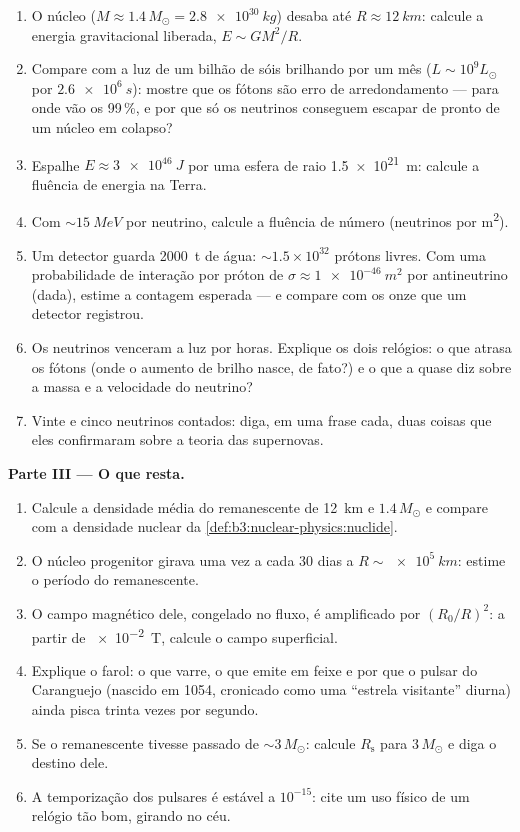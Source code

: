 \begin{problem}
\begin{enumerate}[resume]
  \item O núcleo ($M \approx 1.4\,M_\odot = \qty{2.8e30}{kg}$)
        desaba até $R \approx \qty{12}{km}$: calcule a
        energia gravitacional liberada, $E \sim GM^2/R$.
  \item Compare com a luz de um bilhão de sóis brilhando por um
        mês ($L \sim 10^{9}L_\odot$ por $\qty{2.6e6}{s}$):
        mostre que os fótons são erro de arredondamento --- para onde vão
        os 99\,\%, e por que só os neutrinos conseguem escapar de pronto
        de um núcleo em colapso?
  \item Espalhe $E \approx \qty{3e46}{J}$ por uma esfera de
        raio \qty{1.5e21}{m}: calcule a fluência de energia na
        Terra.
  \item Com $\sim\qty{15}{MeV}$ por neutrino, calcule a
        fluência de número (neutrinos por \unit{m^2}).
  \item Um detector guarda \qty{2000}{t} de água:
        ${\sim}1.5\times10^{32}$ prótons livres. Com uma
        probabilidade de interação por próton de
        $\sigma \approx \qty{1e-46}{m^2}$ por antineutrino
        (dada), estime a contagem esperada --- e compare
        com os onze que um detector registrou.
  \item Os neutrinos venceram a luz por horas. Explique os dois
        relógios: o que atrasa os fótons (onde o
        aumento de brilho nasce, de fato?) e o que a
        quase  diz sobre a massa e a
        velocidade do neutrino?
  \item Vinte e cinco neutrinos contados: diga, em uma frase
        cada, duas coisas que eles confirmaram sobre a teoria das supernovas.
\end{enumerate}

\medskip\noindent\textbf{Parte III --- O que resta.}

\begin{enumerate}[resume]
  \item Calcule a densidade média do remanescente de \qty{12}{km} e
        $1.4\,M_\odot$ e compare com a densidade nuclear da
        \cref{def:b3:nuclear-physics:nuclide}.
  \item O núcleo progenitor girava uma vez a cada 30 dias a
        $R \sim \qty{e5}{km}$: estime o período do remanescente.
  \item O campo magnético dele, congelado no fluxo, é amplificado por
        $(R_0/R)^2$: a partir de \qty{e-2}{T}, calcule o campo
        superficial.
  \item Explique o farol: o que varre, o que emite em feixe e
        por que o pulsar do Caranguejo (nascido em 1054, cronicado como uma
        ``estrela visitante'' diurna) ainda pisca trinta vezes por segundo.
  \item Se o remanescente tivesse passado de ${\sim}3\,M_\odot$: calcule
        $R_{\text{s}}$ para $3\,M_\odot$ e diga o destino dele.
  \item A temporização dos pulsares é estável a $10^{-15}$: cite um uso
        físico de um relógio tão bom, girando no céu.
\end{enumerate}


\end{problem}
